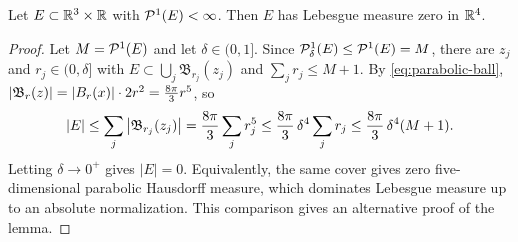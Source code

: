 \documentclass[11pt,reqno]{amsart}
\begin{document}
\begin{lemma}\label{lem:P1-implies-null}
Let $E\subset\mathbb{R}^{3}\times\mathbb{R}$ with $\mathcal{P}^{1}(E)<\infty$. Then $E$ has Lebesgue
measure zero in $\mathbb{R}^{4}$.
\end{lemma}

\begin{proof}
Let $M=\mathcal{P}^{1}(E)$ and let $\delta\in(0,1]$. Since
$\mathcal{P}^{1}_{\delta}(E)\le\mathcal{P}^{1}(E)=M$, there are $z_{j}$ and
$r_{j}\in(0,\delta]$ with $E\subset\bigcup_{j}\mathfrak{B}_{r_{j}}(z_{j})$ and
$\sum_{j}r_{j}\le M+1$. By \eqref{eq:parabolic-ball},
$\left\lvert \mathfrak{B}_{r}(z) \right\rvert=\left\lvert B_{r}(x) \right\rvert\cdot2r^{2}=\tfrac{8\pi}{3}r^{5}$,
so
\[
  \left\lvert E \right\rvert\le\sum_{j}\left\lvert \mathfrak{B}_{r_{j}}(z_{j}) \right\rvert
  =\frac{8\pi}{3}\sum_{j}r_{j}^{5}
  \le\frac{8\pi}{3}\,\delta^{4}\sum_{j}r_{j}
  \le\frac{8\pi}{3}\,\delta^{4}(M+1).
\]
Letting $\delta\to0^{+}$ gives $|E|=0$.
Equivalently, the same cover gives zero five-dimensional parabolic
Hausdorff measure, which dominates Lebesgue measure up to an absolute
normalization. This comparison gives an alternative proof of the lemma.
\end{proof}
\end{document}

